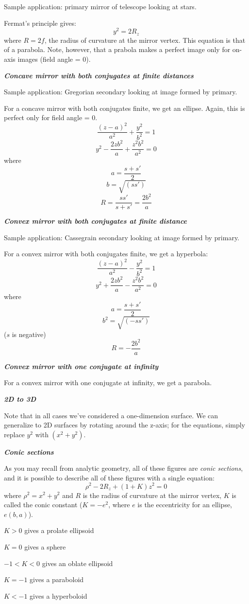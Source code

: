 \documentclass[12pt]{article}
\begin{document}
Sample application: primary mirror of telescope looking at stars.

Fermat's principle gives:
$$ y^{2} = 2R_{z} $$
where $R = 2f$, the radius of curvature at the mirror vertex. This equation
is that of a parabola. Note, however, that a prabola makes a perfect image
only for on-axis images (field angle = 0).

\textbf{\emph{Concave mirror with both conjugates at finite distances}}

Sample application: Gregorian secondary looking at image formed by primary.

For a concave mirror with both conjugates finite, we get an ellipse.
Again, this is perfect only for field angle = 0.
$$ \frac{(z-a)^2}{a^2} + \frac{y^2}{b^2} = 1 $$
$$ y^2 - \frac{2zb^2}{a} + \frac{z^2b^2}{a^2} = 0 $$
where
$$ a = \frac{s+s'}{2} $$
$$ b = \sqrt{(ss')} $$
$$ R = \frac{ss'}{s+s'} = \frac{2b^2}{a} $$

\textbf{\emph{Convex mirror with both conjugates at finite distance}}

Sample application: Cassegrain secondary looking at image formed by primary.

For a convex mirror with both conjugates finite, we get a hyperbola:
$$ \frac{(z-a)^2}{a^2} - \frac{y^2}{b^2} = 1 $$
$$ y^2 + \frac{2zb^2}{a} - \frac{z^2b^2}{a^2} = 0 $$
where
$$ a = \frac{s+s'}{2} $$
$$ b^2 = \sqrt{(-ss')} $$
($s$ is negative)
$$ R = -\frac{2b^2}{a} $$

\textbf{\emph{Convex mirror with one conjugate at infinity}}

For a convex mirror with one conjugate at infinity, we get a parabola.

\textbf{\emph{2D to 3D}}

Note that in all cases we've considered a one-dimension surface. We can
generalize to 2D surfaces by rotating around the z-axis; for the equations,
simply replace $y^2$ with $(x^2 + y^2)$.

\textbf{\emph{Conic sections}}

As you may recall from analytic geometry, all of these figures are
\emph{conic sections}, and it is possible to describe all of these figures with a
single equation:
$$ \rho^2 - 2R_z + (1+K)z^2 = 0 $$
where $ \rho^2 = x^2 + y^2 $
and $R$ is the radius of curvature at the mirror vertex,
$K$ is called the conic constant ($K = -e^2$, where $e$ is the eccentricity for
an ellipse, $e(b, a)$).
\begin{itemize*}
    \item $K > 0$ gives a prolate ellipsoid
    \item $K = 0$ gives a sphere
    \item $-1 < K < 0$ gives an oblate ellipsoid
    \item $K = - 1$ gives a paraboloid
    \item $K < - 1$ gives a hyperboloid
\end{itemize*}
\end{document}
